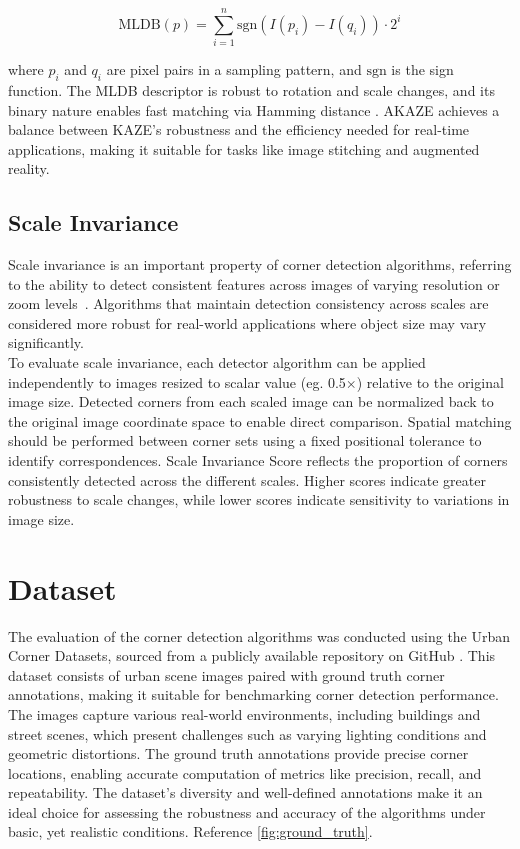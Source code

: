 \documentclass[journal]{IEEEtran}
\begin{document}
\begin{equation}
\text{MLDB}(p) = \sum_{i=1}^{n} \text{sgn}(I(p_i) - I(q_i)) \cdot 2^i
\end{equation}

where \( p_i \) and \( q_i \) are pixel pairs in a sampling pattern, and \( \text{sgn} \) is the sign function. The MLDB descriptor is robust to rotation and scale changes, and its binary nature enables fast matching via Hamming distance \cite{KAZE}. AKAZE achieves a balance between KAZE’s robustness and the efficiency needed for real-time applications, making it suitable for tasks like image stitching and augmented reality.\\

\subsection{Scale Invariance}

Scale invariance is an important property of corner detection algorithms, referring to the ability to detect consistent features across images of varying resolution or zoom levels~\cite{SIFT}. Algorithms that maintain detection consistency across scales are considered more robust for real-world applications where object size may vary significantly.\\

To evaluate scale invariance, each detector algorithm can be applied independently to images resized to scalar value (eg. 0.5$\times$) relative to the original image size. Detected corners from each scaled image can be normalized back to the original image coordinate space to enable direct comparison. Spatial matching should be performed between corner sets using a fixed positional tolerance to identify correspondences. Scale Invariance Score reflects the proportion of corners consistently detected across the different scales. Higher scores indicate greater robustness to scale changes, while lower scores indicate sensitivity to variations in image size.\\

\section{Dataset}
\label{section:datset}

The evaluation of the corner detection algorithms was conducted using the Urban Corner Datasets, sourced from a publicly available repository on GitHub \cite{Urban_Corner_Dataset}. This dataset consists of urban scene images paired with ground truth corner annotations, making it suitable for benchmarking corner detection performance. The images capture various real-world environments, including buildings and street scenes, which present challenges such as varying lighting conditions and geometric distortions. The ground truth annotations provide precise corner locations, enabling accurate computation of metrics like precision, recall, and repeatability. The dataset’s diversity and well-defined annotations make it an ideal choice for assessing the robustness and accuracy of the algorithms under basic, yet realistic conditions. Reference \cref{fig:ground_truth}.\\
\end{document}
